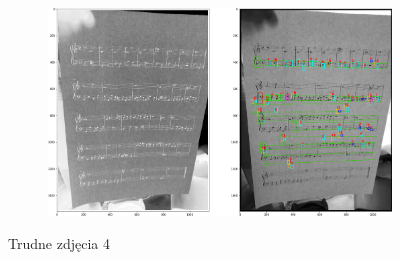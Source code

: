 \documentclass[12pt]{article}
\begin{document}
\begin{enumerate}
\begin{figure}
				\begin{subfigure}[b]{0.48\linewidth}
					\includegraphics[width=\linewidth]{Hard/Zdj36.png}
				\end{subfigure}
				\label{fig:nuuty2}
				\caption{Trudne zdjęcia 4}
			\end{figure}
		\end{enumerate}
	\clearpage
\end{document}
